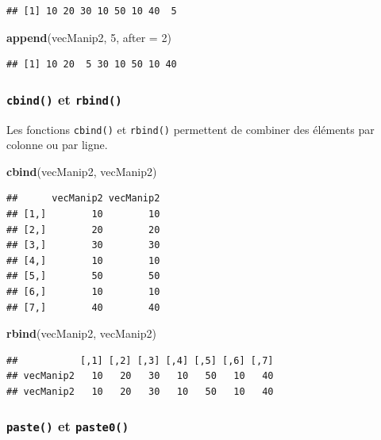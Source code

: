 \documentclass[
]{book}
\newenvironment{Shaded}{\begin{snugshade}}{\end{snugshade}}
\newcommand{\DataTypeTok}[1]{\textcolor[rgb]{0.13,0.29,0.53}{#1}}
\newcommand{\DecValTok}[1]{\textcolor[rgb]{0.00,0.00,0.81}{#1}}
\newcommand{\KeywordTok}[1]{\textcolor[rgb]{0.13,0.29,0.53}{\textbf{#1}}}
\newcommand{\NormalTok}[1]{#1}
\begin{document}
\begin{verbatim}
## [1] 10 20 30 10 50 10 40  5
\end{verbatim}

\begin{Shaded}
\begin{Highlighting}[]
\KeywordTok{append}\NormalTok{(vecManip2, }\DecValTok{5}\NormalTok{, }\DataTypeTok{after =} \DecValTok{2}\NormalTok{)}
\end{Highlighting}
\end{Shaded}

\begin{verbatim}
## [1] 10 20  5 30 10 50 10 40
\end{verbatim}

\hypertarget{l015cbind}{%
\subsubsection{\texorpdfstring{\texttt{cbind()} et \texttt{rbind()}}{cbind() et rbind()}}\label{l015cbind}}

Les fonctions \texttt{cbind()} et \texttt{rbind()} permettent de combiner des éléments par colonne ou par ligne.

\begin{Shaded}
\begin{Highlighting}[]
\KeywordTok{cbind}\NormalTok{(vecManip2, vecManip2)}
\end{Highlighting}
\end{Shaded}

\begin{verbatim}
##      vecManip2 vecManip2
## [1,]        10        10
## [2,]        20        20
## [3,]        30        30
## [4,]        10        10
## [5,]        50        50
## [6,]        10        10
## [7,]        40        40
\end{verbatim}

\begin{Shaded}
\begin{Highlighting}[]
\KeywordTok{rbind}\NormalTok{(vecManip2, vecManip2)}
\end{Highlighting}
\end{Shaded}

\begin{verbatim}
##           [,1] [,2] [,3] [,4] [,5] [,6] [,7]
## vecManip2   10   20   30   10   50   10   40
## vecManip2   10   20   30   10   50   10   40
\end{verbatim}

\hypertarget{l015paste}{%
\subsubsection{\texorpdfstring{\texttt{paste()} et \texttt{paste0()}}{paste() et paste0()}}\label{l015paste}}
\end{document}
